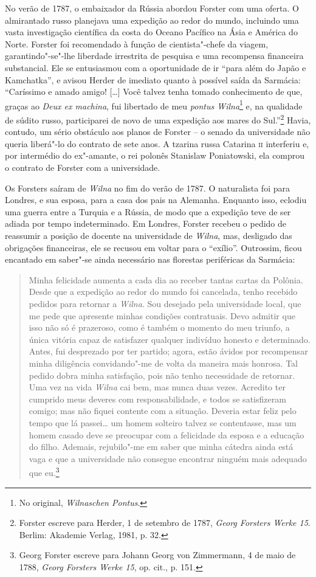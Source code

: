 No verão de 1787, o embaixador da Rússia abordou Forster com uma oferta.
O almirantado russo planejava uma expedição ao redor do mundo, incluindo
uma vasta investigação científica da costa do Oceano Pacífico na Ásia e
América do Norte. Forster foi recomendado à função de cientista"-chefe da
viagem, garantindo"-se"-lhe liberdade irrestrita de pesquisa e uma
recompensa financeira substancial. Ele se entusiasmou com a oportunidade
de ir ``para além do Japão e Kamchatka'', e avisou Herder de imediato
quanto à possível saída da Sarmácia: ``Caríssimo e amado amigo! [\ldots{}]
Você talvez tenha tomado conhecimento de que, graças ao \textit{Deux ex
machina}, fui libertado de meu \textit{pontus Wilna}\footnote{No original, \textit{Wilnaschen
Pontus}.} e, na qualidade de súdito russo, participarei de novo de uma
expedição aos mares do Sul.''\footnote{Forster escreve para Herder, 1 de setembro de 1787, \textit{Georg Forsters Werke 15}. Berlim: Akademie Verlag, 1981, p. 32.} Havia, contudo, um sério obstáculo aos planos de Forster -- o senado da universidade não queria
liberá"-lo do contrato de sete anos. A tzarina russa Catarina \textsc{ii}
interferiu e, por intermédio do ex"-amante, o rei polonês Stanislaw
Poniatowski, ela comprou o contrato de Forster com a universidade.

Os Forsters saíram de \textit{Wilna} no fim do verão de 1787. O naturalista foi
para Londres, e sua esposa, para a casa dos pais na Alemanha. Enquanto
isso, eclodiu uma guerra entre a Turquia e a Rússia, de modo que a
expedição teve de ser adiada por tempo indeterminado. Em Londres,
Forster recebeu o pedido de reassumir a posição de docente na
universidade de \textit{Wilna}, mas, desligado das obrigações financeiras, ele se
recusou em voltar para o ``exílio''. Outrossim, ficou encantado em
saber"-se ainda necessário nas florestas periféricas da Sarmácia:

\begin{quote}
Minha felicidade aumenta a cada dia ao receber tantas cartas da Polônia.
Desde que a expedição ao redor do mundo foi cancelada, tenho recebido
pedidos para retornar a \textit{Wilna}. Sou desejado pela universidade local, que
me pede que apresente minhas condições contratuais. Devo admitir que
isso não só é prazeroso, como é também o momento do meu triunfo, a única
vitória capaz de satisfazer qualquer indivíduo honesto e determinado.
Antes, fui desprezado por ter partido; agora, estão ávidos por
recompensar minha diligência convidando"-me de volta da maneira mais
honrosa. Tal pedido dobra minha satisfação, pois não tenho necessidade
de retornar. Uma vez na vida \textit{Wilna} cai bem, mas nunca duas vezes.
Acredito ter cumprido meus deveres com responsabilidade, e todos se
satisfizeram comigo; mas não fiquei contente com a situação. Deveria
estar feliz pelo tempo que lá passei\ldots{} um homem solteiro talvez se
contentasse, mas um homem casado deve se preocupar com a felicidade da
esposa e a educação do filho. Ademais, rejubilo"-me em saber que minha
cátedra ainda está vaga e que a universidade não consegue encontrar
ninguém mais adequado que eu.\footnote{Georg Forster escreve para Johann Georg von Zimmermann, 4 de maio de 1788, \textit{Georg Forsters Werke 15}, op. cit., p. 151.} 
\end{quote}

